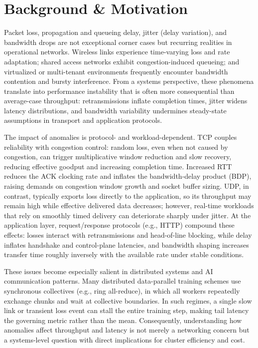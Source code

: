 \documentclass[11pt,a4paper]{article}
\begin{document}
\section{Background \& Motivation}

Packet loss, propagation and queueing delay, jitter (delay variation), and bandwidth drops are not exceptional corner cases but recurring realities in operational networks. Wireless links experience time-varying loss and rate adaptation; shared access networks exhibit congestion-induced queueing; and virtualized or multi-tenant environments frequently encounter bandwidth contention and bursty interference. From a systems perspective, these phenomena translate into performance instability that is often more consequential than average-case throughput: retransmissions inflate completion times, jitter widens latency distributions, and bandwidth variability undermines steady-state assumptions in transport and application protocols.

The impact of anomalies is protocol- and workload-dependent. TCP couples reliability with congestion control: random loss, even when not caused by congestion, can trigger multiplicative window reduction and slow recovery, reducing effective goodput and increasing completion time. Increased RTT reduces the ACK clocking rate and inflates the bandwidth-delay product (BDP), raising demands on congestion window growth and socket buffer sizing. UDP, in contrast, typically exports loss directly to the application, so its throughput may remain high while effective delivered data decreases; however, real-time workloads that rely on smoothly timed delivery can deteriorate sharply under jitter. At the application layer, request/response protocols (e.g., HTTP) compound these effects: losses interact with retransmissions and head-of-line blocking, while delay inflates handshake and control-plane latencies, and bandwidth shaping increases transfer time roughly inversely with the available rate under stable conditions.

These issues become especially salient in distributed systems and AI communication patterns. Many distributed data-parallel training schemes use synchronous collectives (e.g., ring all-reduce), in which all workers repeatedly exchange chunks and wait at collective boundaries. In such regimes, a single slow link or transient loss event can stall the entire training step, making tail latency the governing metric rather than the mean. Consequently, understanding how anomalies affect throughput and latency is not merely a networking concern but a systems-level question with direct implications for cluster efficiency and cost.
\end{document}
